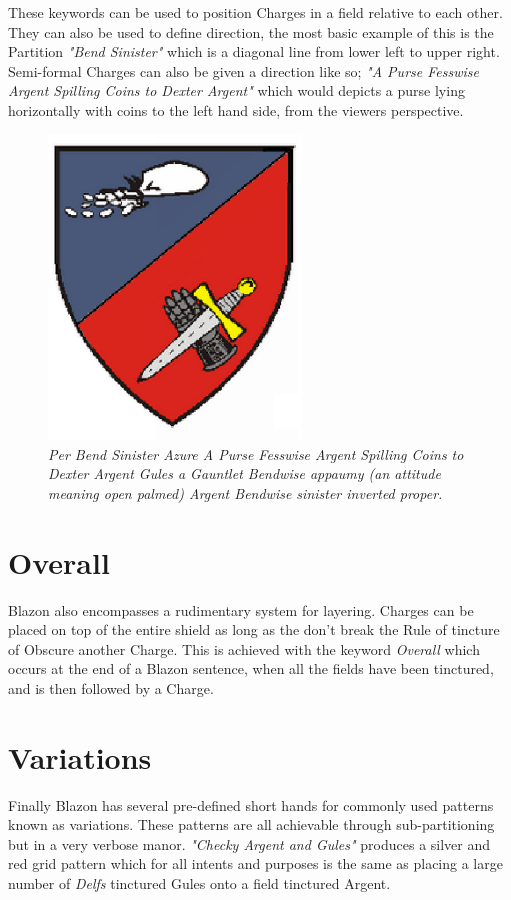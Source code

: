 These keywords can be used to position Charges in a field relative to each other.  They can also be used to define direction, the most basic example of this is the Partition \emph{"Bend Sinister"} which is a diagonal line from lower left to upper right.
Semi-formal Charges can also be given a direction like so; \emph{"A Purse Fesswise Argent Spilling Coins to Dexter Argent"} which would depicts a purse lying horizontally with coins to the left hand side, from the viewers perspective.  

\begin{figure}[H]
  \centering
    \includegraphics[width=0.6\textwidth]{Blazon/images/purse.eps}
  \caption{\emph{Per Bend Sinister Azure A Purse Fesswise Argent Spilling Coins to Dexter Argent Gules a Gauntlet Bendwise appaumy (an attitude meaning open palmed) Argent Bendwise sinister inverted proper.}\cite{fessways}}
  
\end{figure}



\section{Overall}
Blazon also encompasses a rudimentary system for layering.  Charges can be placed on top of the entire shield as long as the don't break the Rule of tincture of Obscure another Charge.  This is achieved with the keyword \emph{Overall} which occurs at the end of a Blazon sentence, when all the fields have been tinctured, and is then followed by a Charge. 


\section{Variations}
Finally Blazon has several pre-defined short hands for commonly used patterns known as variations.  These patterns are all achievable through sub-partitioning but in a very verbose manor.  \emph{"Checky Argent and Gules"} produces a silver and red grid pattern which for all intents and purposes is the same as placing a large number of \emph{Delfs} tinctured Gules onto a field tinctured Argent. 

